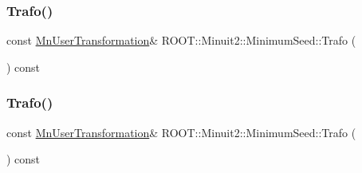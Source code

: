 \mbox{\label{classROOT_1_1Minuit2_1_1MinimumSeed_a140162d25593e6675f6f521fc9d5fc84}} 
\subsubsection{\texorpdfstring{Trafo()}{Trafo()}\hspace{0.1cm}{\footnotesize\ttfamily [1/3]}}
{\footnotesize\ttfamily const \mbox{\hyperlink{classROOT_1_1Minuit2_1_1MnUserTransformation}{Mn\+User\+Transformation}}\& R\+O\+O\+T\+::\+Minuit2\+::\+Minimum\+Seed\+::\+Trafo (\begin{DoxyParamCaption}{ }\end{DoxyParamCaption}) const\hspace{0.3cm}{\ttfamily [inline]}}

\mbox{\label{classROOT_1_1Minuit2_1_1MinimumSeed_a140162d25593e6675f6f521fc9d5fc84}} 
\subsubsection{\texorpdfstring{Trafo()}{Trafo()}\hspace{0.1cm}{\footnotesize\ttfamily [2/3]}}
{\footnotesize\ttfamily const \mbox{\hyperlink{classROOT_1_1Minuit2_1_1MnUserTransformation}{Mn\+User\+Transformation}}\& R\+O\+O\+T\+::\+Minuit2\+::\+Minimum\+Seed\+::\+Trafo (\begin{DoxyParamCaption}{ }\end{DoxyParamCaption}) const\hspace{0.3cm}{\ttfamily [inline]}}


